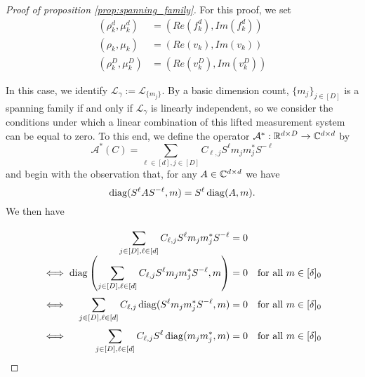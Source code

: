 \begin{proof}[Proof of proposition \ref{prop:spanning_family}]
  For this proof, we set \begin{align*} (\rho_k^d, \mu_k^d) &= (Re(f_k^d), Im(f_k^d)) \\ (\rho_k, \mu_k) &= (Re(v_k), Im(v_k)) \\ (\rho_k^D, \mu_k^D) &= (Re(v_k^D), Im(v_k^D)) \end{align*}
  
  In this case, we identify $\mathcal{L}_\gamma := \mathcal{L}_{\{m_j\}}$.  By a basic dimension count, $\{m_j\}_{j \in [D]}$ is a spanning family if and only if $\mathcal{L}_\gamma$ is linearly independent, so we consider the conditions under which a linear combination of this lifted measurement system can be equal to zero.  To this end, we define the operator $\mathcal{A}^* : \mathbb{R}^{d \times D} \to \mathbb{C}^{d \times d}$ by \begin{equation} \mathcal{A}^*(C) = \sum_{\ell \in [d], j \in [D]} C_{\ell, j} S^\ell m_j m_j^* S^{-\ell} \label{eq:synth_op} \end{equation} and begin with the observation that, for any $A \in \mathbb{C}^{d \times d}$ we have \[\operatorname{diag}(S^\ell A S^{-\ell}, m) = S^\ell \operatorname{diag}(A, m).\]  We then have
  \[\arraycolsep=1.4pt\def\arraystretch{2}
  \begin{array}{c>{\displaystyle}rcl@{\quad}r}
    & \sum_{j \in [D], \ell \in [d]} C_{\ell, j} S^\ell m_j m_j^* S^{-\ell} & = & 0 & \\
    \iff & \diag\left(\sum_{j \in [D], \ell \in [d]} C_{\ell, j} S^\ell m_j m_j^* S^{-\ell}, m\right) & = & 0 & \text{for all} \ m \in [\delta]_0 \\
    \iff & \sum_{j \in [D], \ell \in [d]} C_{\ell, j} \diag(S^\ell m_j m_j^* S^{-\ell}, m) & = & 0 & \text{for all} \ m \in [\delta]_0 \\
    \iff & \sum_{j \in [D], \ell \in [d]} C_{\ell, j} S^{\ell} \diag(m_j m_j^*, m) & = & 0 & \text{for all} \ m \in [\delta]_0 \\
  \end{array}\]
  

\end{proof}
